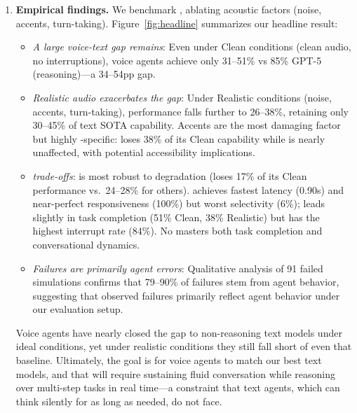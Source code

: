 \begin{enumerate}
    \item \textbf{Empirical findings.} We benchmark , ablating acoustic factors (noise, accents, turn-taking). Figure~\ref{fig:headline} summarizes our headline result:
    \begin{itemize}[nosep,leftmargin=1em]
        \item \textit{A large voice-text gap remains}: Even under Clean conditions (clean audio, no interruptions), voice agents achieve only 31--51\% vs 85\% GPT-5 (reasoning)---a 34--54pp gap.
        \item \textit{Realistic audio exacerbates the gap}: Under Realistic conditions (noise, accents, turn-taking), performance falls further to 26--38\%, retaining only 30--45\% of text SOTA capability. Accents are the most damaging factor but highly -specific:  loses 38\% of its Clean capability while  is nearly unaffected, with potential accessibility implications.
        \item \textit{ trade-offs}:  is most robust to degradation (loses 17\% of its Clean performance vs.\ 24--28\% for others).  achieves fastest latency (0.90s) and near-perfect responsiveness (100\%) but worst selectivity (6\%);  leads slightly in task completion (51\% Clean, 38\% Realistic) but has the highest interrupt rate (84\%). No  masters both task completion and conversational dynamics.
        \item \textit{Failures are primarily agent errors}: Qualitative analysis of 91 failed simulations confirms that 79--90\% of failures stem from agent behavior, suggesting that observed failures primarily reflect agent behavior under our evaluation setup.
    \end{itemize}
Voice agents have nearly closed the gap to non-reasoning text models under ideal conditions, yet under realistic conditions they still fall short of even that baseline. Ultimately, the goal is for voice agents to match our best text models, and that will require sustaining fluid conversation while reasoning over multi-step tasks in real time---a constraint that text agents, which can think silently for as long as needed, do not face.
\end{enumerate}

